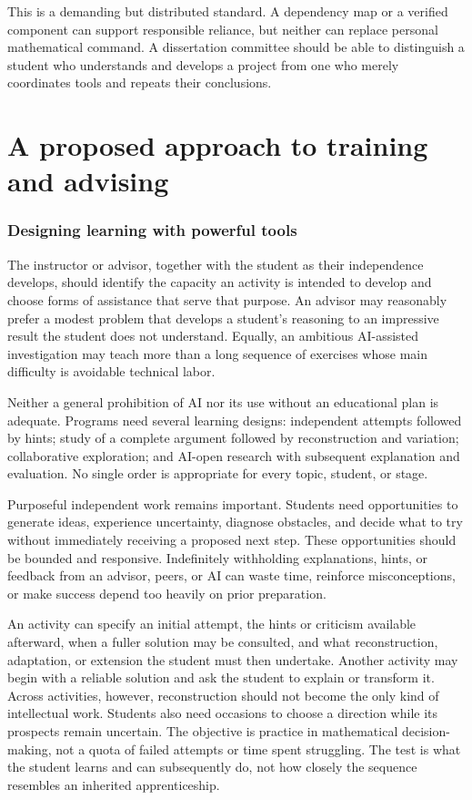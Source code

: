 \documentclass[11pt]{article}
\begin{document}
This is a demanding but distributed standard. A dependency map or a verified component
can support responsible reliance, but neither can replace personal mathematical command.
A dissertation committee should be able to distinguish a student who understands and
develops a project from one who merely coordinates tools and repeats their conclusions.

\clearpage
\part{A proposed approach to training and advising}

\section{Designing learning with powerful tools}

The instructor or advisor, together with the student as their independence develops,
should identify the capacity an activity is intended to develop and choose forms of
assistance that serve that purpose. An advisor may reasonably prefer a
modest problem that develops a student's reasoning to an impressive result the student
does not understand. Equally, an ambitious AI-assisted investigation may teach more
than a long sequence of exercises whose main difficulty is avoidable technical labor.

Neither a general prohibition of AI nor its use without an educational plan is adequate.
Programs need several
learning designs: independent attempts followed by hints; study of a complete argument
followed by reconstruction and variation; collaborative exploration; and AI-open
research with subsequent explanation and evaluation. No single order is appropriate
for every topic, student, or stage.

Purposeful independent work remains important. Students need opportunities to generate
ideas, experience uncertainty, diagnose obstacles, and decide what to try without
immediately receiving a proposed next step. These opportunities should be bounded and
responsive. Indefinitely withholding explanations, hints, or feedback from an advisor,
peers, or AI can waste time, reinforce misconceptions, or make success depend too heavily
on prior preparation.

An activity can specify an initial attempt, the hints or criticism available afterward,
when a fuller solution may be consulted, and what reconstruction, adaptation, or extension
the student must then undertake. Another activity may begin with a reliable solution and
ask the student to explain or transform it. Across activities, however, reconstruction
should not become the only kind of intellectual work. Students also need occasions to
choose a direction while its prospects remain uncertain. The objective is practice in
mathematical decision-making, not a quota of failed attempts or time spent struggling.
The test is what the student learns and can subsequently do, not how closely the
sequence resembles an inherited apprenticeship.
\end{document}
